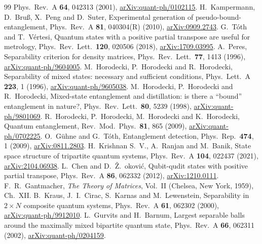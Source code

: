 \documentclass[11pt]{article}
\theoremstyle{remark}
\begin{document}
\begin{thebibliography}{99}
Phys.\ Rev.\ A \textbf{64}, 042313 (2001), \href{https://arxiv.org/abs/quant-ph/0102115}{arXiv:quant-ph/0102115}.
 H.~Kampermann, D.~Bru\ss, X.~Peng and D.~Suter, Experimental generation of pseudo-bound-entanglement, Phys.\
Rev.\ A \textbf{81}, 040304(R) (2010), \href{https://arxiv.org/abs/0909.2743}{arXiv:0909.2743}.
\bibitem{TV} G.~T\'oth and T.~V\'ertesi, Quantum states with a positive partial transpose are useful for metrology, Phys.\
Rev.\ Lett.\ \textbf{120}, 020506 (2018), \href{https://arxiv.org/abs/1709.03995}{arXiv:1709.03995}.
\bibitem{Peres} A.~Peres, Separability criterion for density matrices, Phys.\ Rev.\ Lett.\ \textbf{77}, 1413 (1996),
\href{https://arxiv.org/abs/quant-ph/9604005}{arXiv:quant-ph/9604005}.
\bibitem{HHH96} M.~Horodecki, P.~Horodecki and R.~Horodecki, Separability of mixed states: necessary and sufficient
conditions, Phys.\ Lett.\ A \textbf{223}, 1 (1996), \href{https://arxiv.org/abs/quant-ph/9605038}{arXiv:quant-ph/9605038}.
\bibitem{HHH98} M.~Horodecki, P.~Horodecki and R.~Horodecki, Mixed-state entanglement and distillation: is there a
``bound'' entanglement in nature?, Phys.\ Rev.\ Lett.\ \textbf{80}, 5239 (1998),
\href{https://arxiv.org/abs/quant-ph/9801069}{arXiv:quant-ph/9801069}.
\bibitem{HHH09} R.~Horodecki, P.~Horodecki, M.~Horodecki and K.~Horodecki, Quantum entanglement, Rev.\ Mod.\ Phys.\
\textbf{81}, 865 (2009), \href{https://arxiv.org/abs/quant-ph/0702225}{arXiv:quant-ph/0702225}.
\bibitem{GT09} O.~G\"uhne and G.~T\'oth, Entanglement detection, Phys.\ Rep.\ \textbf{474}, 1 (2009),
\href{https://arxiv.org/abs/0811.2803}{arXiv:0811.2803}.
\bibitem{KRB} H.~Krishnan S.~V., A.~Ranjan and M.~Banik, State space structure of tripartite quantum systems,
Phys.\ Rev.\ A \textbf{104}, 022437 (2021), \href{https://arxiv.org/abs/2104.06938}{arXiv:2104.06938}.
\bibitem{CD} L.~Chen and D.~\v{Z}.~\DJ{}okovi\'c, Qubit-qudit states with positive partial transpose, Phys.\ Rev.\ A \textbf{86}, 062332 (2012), \href{https://arxiv.org/abs/1210.0111}{arXiv:1210.0111}.
\bibitem{Gant} F.~R.~Gantmacher, \emph{The Theory of Matrices}, Vol.~II (Chelsea, New York, 1959), Ch.~XII.
\bibitem{KCKL} B.~Kraus, J.~I.~Cirac, S.~Karnas and M.~Lewenstein, Separability in $2\times N$ composite quantum systems,
Phys.\ Rev.\ A \textbf{61}, 062302 (2000), \href{https://arxiv.org/abs/quant-ph/9912010}{arXiv:quant-ph/9912010}.
\bibitem{GB} L.~Gurvits and H.~Barnum, Largest separable balls around the maximally mixed bipartite quantum state,
Phys.\ Rev.\ A \textbf{66}, 062311 (2002), \href{https://arxiv.org/abs/quant-ph/0204159}{arXiv:quant-ph/0204159}.

\end{thebibliography}
\end{document}
